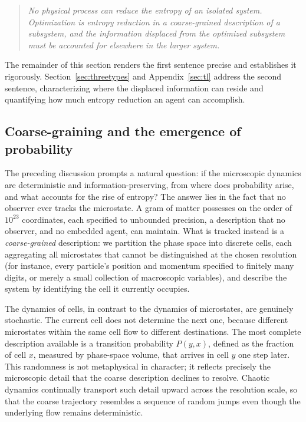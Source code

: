 \documentclass[11pt]{article}
\begin{document}
\begin{quote}
\emph{No physical process can reduce the entropy of an isolated system. Optimization is entropy reduction in a coarse-grained description of a subsystem, and the information displaced from the optimized subsystem must be accounted for elsewhere in the larger system.}
\end{quote}

The remainder of this section renders the first sentence precise and establishes it rigorously. Section~\ref{sec:threetypes} and Appendix~\ref{sec:tl} address the second sentence, characterizing where the displaced information can reside and quantifying how much entropy reduction an agent can accomplish.

\subsection{Coarse-graining and the emergence of probability}
\label{sec:coarse}

The preceding discussion prompts a natural question: if the microscopic dynamics are deterministic and information-preserving, from where does probability arise, and what accounts for the rise of entropy? The answer lies in the fact that no observer ever tracks the microstate. A gram of matter possesses on the order of $10^{23}$ coordinates, each specified to unbounded precision, a description that no observer, and no embedded agent, can maintain. What is tracked instead is a \emph{coarse-grained} description: we partition the phase space into discrete cells, each aggregating all microstates that cannot be distinguished at the chosen resolution (for instance, every particle's position and momentum specified to finitely many digits, or merely a small collection of macroscopic variables), and describe the system by identifying the cell it currently occupies.

The dynamics of cells, in contrast to the dynamics of microstates, are genuinely stochastic. The current cell does not determine the next one, because different microstates within the same cell flow to different destinations. The most complete description available is a transition probability $P(y, x)$, defined as the fraction of cell $x$, measured by phase-space volume, that arrives in cell $y$ one step later. This randomness is not metaphysical in character; it reflects precisely the microscopic detail that the coarse description declines to resolve. Chaotic dynamics continually transport such detail upward across the resolution scale, so that the coarse trajectory resembles a sequence of random jumps even though the underlying flow remains deterministic.
\end{document}
